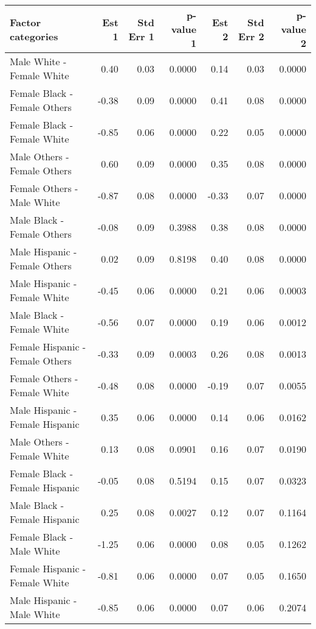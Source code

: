 \documentclass[11pt]{extarticle} %
\begin{document}
\begin{table}[H]
\footnotesize
\centering
\begin{tabular}{lrrrrrr}
  \hline
  Factor categories & Est 1 & Std Err 1 & p-value 1 & Est 2 & Std Err 2 & p-value 2 \\ 
  \hline
    Male White -  Female White & 0.40 & 0.03 & 0.0000 & 0.14 & 0.03 & 0.0000 \\ 
    Female Black -  Female Others & -0.38 & 0.09 & 0.0000 & 0.41 & 0.08 & 0.0000 \\ 
    Female Black -  Female White & -0.85 & 0.06 & 0.0000 & 0.22 & 0.05 & 0.0000 \\ 
    Male Others -  Female Others & 0.60 & 0.09 & 0.0000 & 0.35 & 0.08 & 0.0000 \\ 
    Female Others -  Male White & -0.87 & 0.08 & 0.0000 & -0.33 & 0.07 & 0.0000 \\ 
    Male Black -  Female Others & -0.08 & 0.09 & 0.3988 & 0.38 & 0.08 & 0.0000 \\ 
    Male Hispanic -  Female Others & 0.02 & 0.09 & 0.8198 & 0.40 & 0.08 & 0.0000 \\ 
    Male Hispanic -  Female White & -0.45 & 0.06 & 0.0000 & 0.21 & 0.06 & 0.0003 \\ 
    Male Black -  Female White & -0.56 & 0.07 & 0.0000 & 0.19 & 0.06 & 0.0012 \\ 
    Female Hispanic -  Female Others & -0.33 & 0.09 & 0.0003 & 0.26 & 0.08 & 0.0013 \\ 
    Female Others -  Female White & -0.48 & 0.08 & 0.0000 & -0.19 & 0.07 & 0.0055 \\ 
    Male Hispanic -  Female Hispanic & 0.35 & 0.06 & 0.0000 & 0.14 & 0.06 & 0.0162 \\ 
    Male Others -  Female White & 0.13 & 0.08 & 0.0901 & 0.16 & 0.07 & 0.0190 \\ 
    Female Black -  Female Hispanic & -0.05 & 0.08 & 0.5194 & 0.15 & 0.07 & 0.0323 \\ 
    Male Black -  Female Hispanic & 0.25 & 0.08 & 0.0027 & 0.12 & 0.07 & 0.1164 \\ 
    Female Black -  Male White & -1.25 & 0.06 & 0.0000 & 0.08 & 0.05 & 0.1262 \\ 
    Female Hispanic -  Female White & -0.81 & 0.06 & 0.0000 & 0.07 & 0.05 & 0.1650 \\ 
    Male Hispanic -  Male White & -0.85 & 0.06 & 0.0000 & 0.07 & 0.06 & 0.2074 \\ 

\end{tabular}
\end{table}
\end{document}
